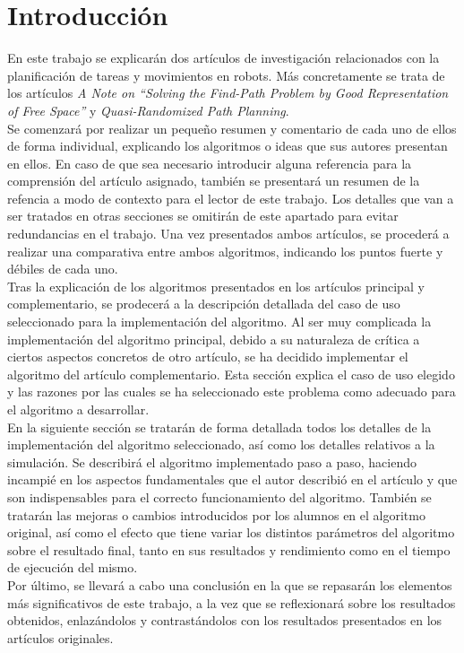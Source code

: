 \chapter{Introducción}
\label{introduccion}

En este trabajo se explicarán dos artículos de investigación relacionados con la planificación de tareas y movimientos en robots. Más concretamente se trata de los artículos \textit{A Note on ``Solving the Find-Path Problem by Good Representation of Free Space''} y \textit{Quasi-Randomized Path Planning}.\\

Se comenzará por realizar un pequeño resumen y comentario de cada uno de ellos de forma individual, explicando los algoritmos o ideas que sus autores presentan en ellos. En caso de que sea necesario introducir alguna referencia para la comprensión del artículo asignado, también se presentará un resumen de la refencia a modo de contexto para el lector de este trabajo. Los detalles que van a ser tratados en otras secciones se omitirán de este apartado para evitar redundancias en el trabajo. Una vez presentados ambos artículos, se procederá a realizar una comparativa entre ambos algoritmos, indicando los puntos fuerte y débiles de cada uno.\\

Tras la explicación de los algoritmos presentados en los artículos principal y complementario, se prodecerá a la descripción detallada del caso de uso seleccionado para la implementación del algoritmo. Al ser muy complicada la implementación del algoritmo principal, debido a su naturaleza de crítica a ciertos aspectos concretos de otro artículo, se ha decidido implementar el algoritmo del artículo complementario. Esta sección explica el caso de uso elegido y las razones por las cuales se ha seleccionado este problema como adecuado para el algoritmo a desarrollar.\\

En la siguiente sección se tratarán de forma detallada todos los detalles de la implementación del algoritmo seleccionado, así como los detalles relativos a la simulación. Se describirá el algoritmo implementado paso a paso, haciendo incampié en los aspectos fundamentales que el autor describió en el artículo y que son indispensables para el correcto funcionamiento del algoritmo. También se tratarán las mejoras o cambios introducidos por los alumnos en el algoritmo original, así como el efecto que tiene variar los distintos parámetros del algoritmo sobre el resultado final, tanto en sus resultados y rendimiento como en el tiempo de ejecución del mismo.\\

Por último, se llevará a cabo una conclusión en la que se repasarán los elementos más significativos de este trabajo, a la vez que se reflexionará sobre los resultados obtenidos, enlazándolos y contrastándolos con los resultados presentados en los artículos originales.\\